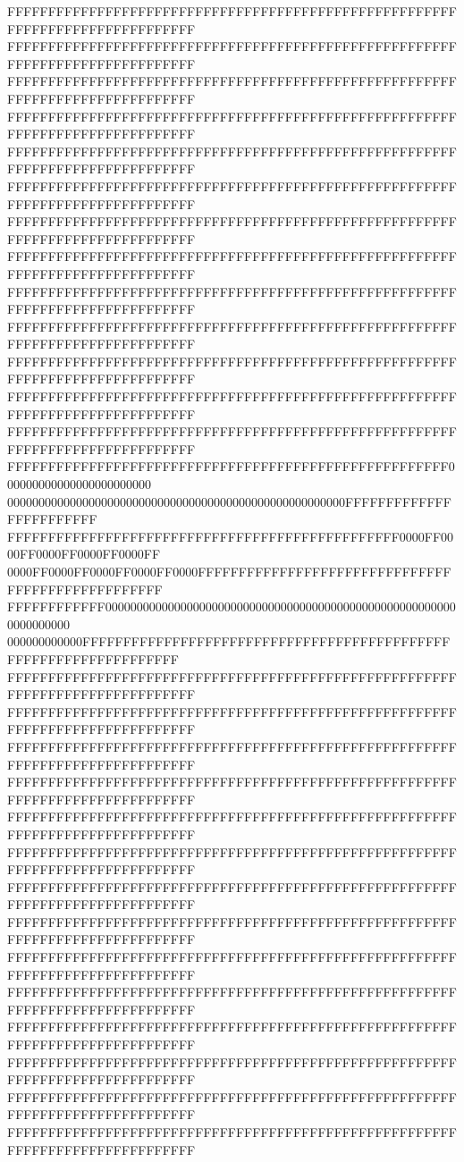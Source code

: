 FFFFFFFFFFFFFFFFFFFFFFFFFFFFFFFFFFFFFFFFFFFFFFFFFFFFFFFFFFFFFFFFFFFFFFFFFFFFFF
FFFFFFFFFFFFFFFFFFFFFFFFFFFFFFFFFFFFFFFFFFFFFFFFFFFFFFFFFFFFFFFFFFFFFFFFFFFFFF
FFFFFFFFFFFFFFFFFFFFFFFFFFFFFFFFFFFFFFFFFFFFFFFFFFFFFFFFFFFFFFFFFFFFFFFFFFFFFF
FFFFFFFFFFFFFFFFFFFFFFFFFFFFFFFFFFFFFFFFFFFFFFFFFFFFFFFFFFFFFFFFFFFFFFFFFFFFFF
FFFFFFFFFFFFFFFFFFFFFFFFFFFFFFFFFFFFFFFFFFFFFFFFFFFFFFFFFFFFFFFFFFFFFFFFFFFFFF
FFFFFFFFFFFFFFFFFFFFFFFFFFFFFFFFFFFFFFFFFFFFFFFFFFFFFFFFFFFFFFFFFFFFFFFFFFFFFF
FFFFFFFFFFFFFFFFFFFFFFFFFFFFFFFFFFFFFFFFFFFFFFFFFFFFFFFFFFFFFFFFFFFFFFFFFFFFFF
FFFFFFFFFFFFFFFFFFFFFFFFFFFFFFFFFFFFFFFFFFFFFFFFFFFFFFFFFFFFFFFFFFFFFFFFFFFFFF
FFFFFFFFFFFFFFFFFFFFFFFFFFFFFFFFFFFFFFFFFFFFFFFFFFFFFFFFFFFFFFFFFFFFFFFFFFFFFF
FFFFFFFFFFFFFFFFFFFFFFFFFFFFFFFFFFFFFFFFFFFFFFFFFFFFFFFFFFFFFFFFFFFFFFFFFFFFFF
FFFFFFFFFFFFFFFFFFFFFFFFFFFFFFFFFFFFFFFFFFFFFFFFFFFFFFFFFFFFFFFFFFFFFFFFFFFFFF
FFFFFFFFFFFFFFFFFFFFFFFFFFFFFFFFFFFFFFFFFFFFFFFFFFFFFFFFFFFFFFFFFFFFFFFFFFFFFF
FFFFFFFFFFFFFFFFFFFFFFFFFFFFFFFFFFFFFFFFFFFFFFFFFFFFFFFFFFFFFFFFFFFFFFFFFFFFFF
FFFFFFFFFFFFFFFFFFFFFFFFFFFFFFFFFFFFFFFFFFFFFFFFFFFFFF000000000000000000000000
000000000000000000000000000000000000000000000000000000FFFFFFFFFFFFFFFFFFFFFFFF
FFFFFFFFFFFFFFFFFFFFFFFFFFFFFFFFFFFFFFFFFFFFFFFF0000FF0000FF0000FF0000FF0000FF
0000FF0000FF0000FF0000FF0000FFFFFFFFFFFFFFFFFFFFFFFFFFFFFFFFFFFFFFFFFFFFFFFFFF
FFFFFFFFFFFF000000000000000000000000000000000000000000000000000000000000000000
000000000000FFFFFFFFFFFFFFFFFFFFFFFFFFFFFFFFFFFFFFFFFFFFFFFFFFFFFFFFFFFFFFFFFF
FFFFFFFFFFFFFFFFFFFFFFFFFFFFFFFFFFFFFFFFFFFFFFFFFFFFFFFFFFFFFFFFFFFFFFFFFFFFFF
FFFFFFFFFFFFFFFFFFFFFFFFFFFFFFFFFFFFFFFFFFFFFFFFFFFFFFFFFFFFFFFFFFFFFFFFFFFFFF
FFFFFFFFFFFFFFFFFFFFFFFFFFFFFFFFFFFFFFFFFFFFFFFFFFFFFFFFFFFFFFFFFFFFFFFFFFFFFF
FFFFFFFFFFFFFFFFFFFFFFFFFFFFFFFFFFFFFFFFFFFFFFFFFFFFFFFFFFFFFFFFFFFFFFFFFFFFFF
FFFFFFFFFFFFFFFFFFFFFFFFFFFFFFFFFFFFFFFFFFFFFFFFFFFFFFFFFFFFFFFFFFFFFFFFFFFFFF
FFFFFFFFFFFFFFFFFFFFFFFFFFFFFFFFFFFFFFFFFFFFFFFFFFFFFFFFFFFFFFFFFFFFFFFFFFFFFF
FFFFFFFFFFFFFFFFFFFFFFFFFFFFFFFFFFFFFFFFFFFFFFFFFFFFFFFFFFFFFFFFFFFFFFFFFFFFFF
FFFFFFFFFFFFFFFFFFFFFFFFFFFFFFFFFFFFFFFFFFFFFFFFFFFFFFFFFFFFFFFFFFFFFFFFFFFFFF
FFFFFFFFFFFFFFFFFFFFFFFFFFFFFFFFFFFFFFFFFFFFFFFFFFFFFFFFFFFFFFFFFFFFFFFFFFFFFF
FFFFFFFFFFFFFFFFFFFFFFFFFFFFFFFFFFFFFFFFFFFFFFFFFFFFFFFFFFFFFFFFFFFFFFFFFFFFFF
FFFFFFFFFFFFFFFFFFFFFFFFFFFFFFFFFFFFFFFFFFFFFFFFFFFFFFFFFFFFFFFFFFFFFFFFFFFFFF
FFFFFFFFFFFFFFFFFFFFFFFFFFFFFFFFFFFFFFFFFFFFFFFFFFFFFFFFFFFFFFFFFFFFFFFFFFFFFF
FFFFFFFFFFFFFFFFFFFFFFFFFFFFFFFFFFFFFFFFFFFFFFFFFFFFFFFFFFFFFFFFFFFFFFFFFFFFFF
FFFFFFFFFFFFFFFFFFFFFFFFFFFFFFFFFFFFFFFFFFFFFFFFFFFFFFFFFFFFFFFFFFFFFFFFFFFFFF
